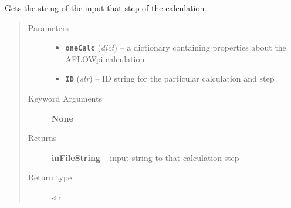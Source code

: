 \documentclass[letterpaper,10pt,english]{sphinxmanual}
\begin{document}

\begin{fulllineitems}
\label{retr:retr.__getInputFileString}
Gets the string of the input that step of the calculation
\begin{quote}\begin{description}
\item[{Parameters}] \leavevmode\begin{itemize}
\item {} 
\textbf{\texttt{oneCalc}} (\emph{dict}) -- a dictionary containing properties about the AFLOWpi calculation

\item {} 
\textbf{\texttt{ID}} (\emph{str}) -- ID string for the particular calculation and step

\end{itemize}

\item[{Keyword Arguments}] \leavevmode
\textbf{None}

\item[{Returns}] \leavevmode
\textbf{inFileString} --
input string to that calculation step

\item[{Return type}] \leavevmode
str

\end{description}\end{quote}

\end{fulllineitems}

\end{document}
